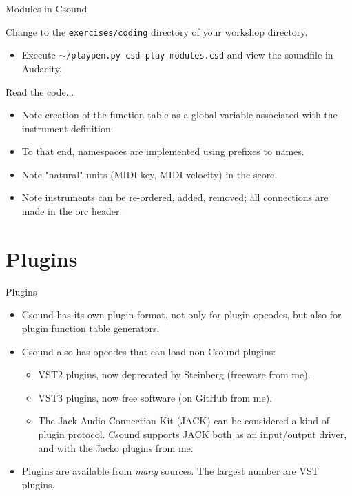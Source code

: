\documentclass{beamer}
\begin{document}
\begin{frame}{Modules in Csound}
\begin{example}
Change to the \texttt{exercises/coding} directory of your workshop directory.
\begin{itemize}
\item Execute \texttt{$\sim$/playpen.py csd-play modules.csd} and view the soundfile in Audacity.
\end{itemize}
Read the code...
\begin{itemize}
\item Note creation of the function table as a global variable associated with the instrument definition.
\item To that end, namespaces are implemented using prefixes to names.
\item Note "natural" units (MIDI key, MIDI velocity) in the score.
\item Note instruments can be re-ordered, added, removed; all connections are made in the orc header.
\end{itemize}
\end{example}
\end{frame}

\section{Plugins}

\begin{frame}{Plugins}
\begin{itemize}
\item Csound has its own plugin format, not only for plugin opcodes, but also for plugin function table generators.
\item Csound also has opcodes that can load non-Csound plugins:
\begin{itemize}
\item VST2 plugins, now deprecated by Steinberg (freeware from me).
\item VST3 plugins, now free software (on GitHub from me).
\item The Jack Audio Connection Kit (JACK) can be considered a kind of plugin protocol. Csound supports JACK both as an input/output driver, and with the Jacko plugins from me.
\end{itemize}
\item Plugins are available from \emph{many} sources. The largest number are VST plugins.
\end{itemize}
\end{frame}
\end{document}
